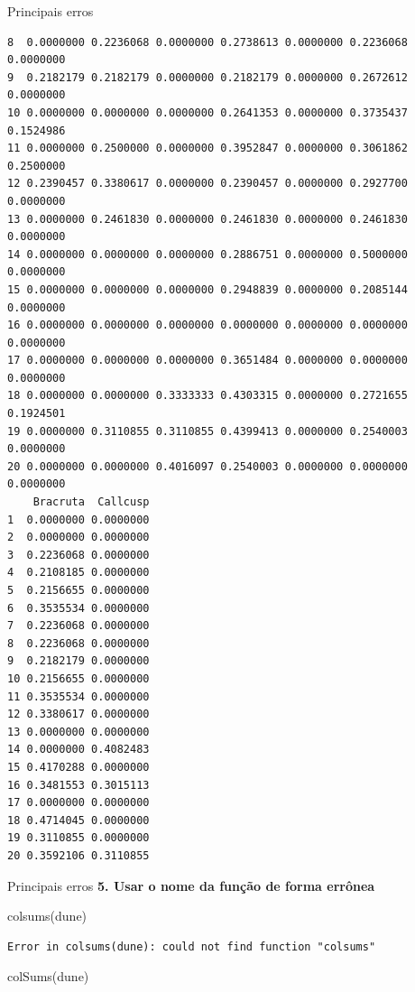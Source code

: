 \documentclass[
  ignorenonframetext,
]{beamer}
\newenvironment{Shaded}{\begin{snugshade}}{\end{snugshade}}
\newcommand{\FunctionTok}[1]{\textcolor[rgb]{0.28,0.35,0.67}{#1}}
\newcommand{\NormalTok}[1]{\textcolor[rgb]{0.00,0.23,0.31}{#1}}
\begin{document}
\begin{frame}[fragile]{}
\begin{block}{Principais erros}
\begin{verbatim}
8  0.0000000 0.2236068 0.0000000 0.2738613 0.0000000 0.2236068 0.0000000
9  0.2182179 0.2182179 0.0000000 0.2182179 0.0000000 0.2672612 0.0000000
10 0.0000000 0.0000000 0.0000000 0.2641353 0.0000000 0.3735437 0.1524986
11 0.0000000 0.2500000 0.0000000 0.3952847 0.0000000 0.3061862 0.2500000
12 0.2390457 0.3380617 0.0000000 0.2390457 0.0000000 0.2927700 0.0000000
13 0.0000000 0.2461830 0.0000000 0.2461830 0.0000000 0.2461830 0.0000000
14 0.0000000 0.0000000 0.0000000 0.2886751 0.0000000 0.5000000 0.0000000
15 0.0000000 0.0000000 0.0000000 0.2948839 0.0000000 0.2085144 0.0000000
16 0.0000000 0.0000000 0.0000000 0.0000000 0.0000000 0.0000000 0.0000000
17 0.0000000 0.0000000 0.0000000 0.3651484 0.0000000 0.0000000 0.0000000
18 0.0000000 0.0000000 0.3333333 0.4303315 0.0000000 0.2721655 0.1924501
19 0.0000000 0.3110855 0.3110855 0.4399413 0.0000000 0.2540003 0.0000000
20 0.0000000 0.0000000 0.4016097 0.2540003 0.0000000 0.0000000 0.0000000
    Bracruta  Callcusp
1  0.0000000 0.0000000
2  0.0000000 0.0000000
3  0.2236068 0.0000000
4  0.2108185 0.0000000
5  0.2156655 0.0000000
6  0.3535534 0.0000000
7  0.2236068 0.0000000
8  0.2236068 0.0000000
9  0.2182179 0.0000000
10 0.2156655 0.0000000
11 0.3535534 0.0000000
12 0.3380617 0.0000000
13 0.0000000 0.0000000
14 0.0000000 0.4082483
15 0.4170288 0.0000000
16 0.3481553 0.3015113
17 0.0000000 0.0000000
18 0.4714045 0.0000000
19 0.3110855 0.0000000
20 0.3592106 0.3110855
\end{verbatim}
\end{block}

\begin{block}{Principais erros}
\protect\hypertarget{principais-erros-5}{}
\textbf{5. Usar o nome da função de forma errônea}

\begin{Shaded}
\begin{Highlighting}[]
\FunctionTok{colsums}\NormalTok{(dune)}
\end{Highlighting}
\end{Shaded}

\begin{verbatim}
Error in colsums(dune): could not find function "colsums"
\end{verbatim}

\begin{Shaded}
\begin{Highlighting}[]
\FunctionTok{colSums}\NormalTok{(dune)}
\end{Highlighting}
\end{Shaded}


\end{block}
\end{frame}
\end{document}
